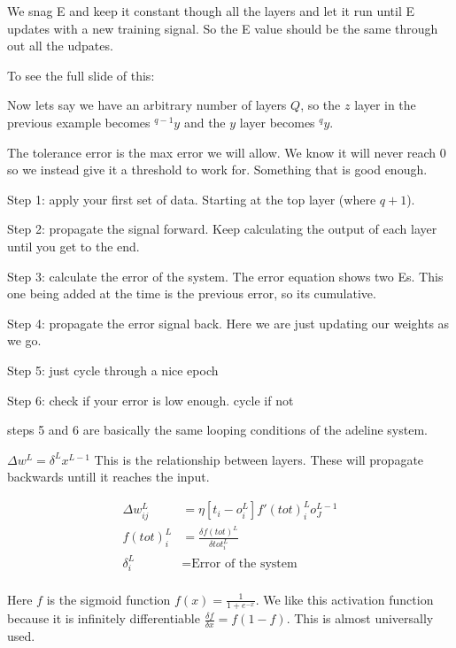 \documentclass{article}
\begin{document}
We snag E and keep it constant though all the layers and let it run until E updates with a new training signal. So the E value should be the same through out all the udpates.

To see the full slide of this:




Now lets say we have an arbitrary number of layers $Q$, so the $z$ layer in the previous example becomes ${}^{q-1}y$ and the $y$ layer becomes ${}^qy$.

The tolerance error is the max error we will allow. We know it will never reach 0 so we instead give it a threshold to work for. Something that is good enough.


Step 1: apply your first set of data. Starting at the top layer (where $q+1$).

Step 2: propagate the signal forward. Keep calculating the output  of each layer until  you get to the end.

Step 3: calculate the error of the system. The error equation shows two Es. This one being added at the time is the previous error, so its cumulative.


Step 4: propagate the error signal back. Here we are just updating our weights as we go.

Step 5: just cycle through a nice epoch

Step 6: check if your error is low enough. cycle if not

steps 5 and 6 are basically the same looping conditions of the adeline system.




$\Delta w^L = \delta^L x^{L-1}$ This is the relationship between layers. These will propagate backwards untill it reaches the input.

\begin{align*}
	\Delta w_{ij}^L &= \eta \left[ t_i - o_i^L \right] f'(tot)_i^L o_J^{L-1}\\
	f(tot)_i^L &= \frac{\delta f(tot)^L}{\delta tot_i^L}\\
	\delta_i^L &= \text{Error of the system}\\
\end{align*}

Here $f$ is the sigmoid function $f(x) = \frac{1}{1+e^{-x}}$. We like this activation function because it is infinitely differentiable $\frac{\delta f}{\delta x} = f(1-f)$. This is almost universally used.
\end{document}

